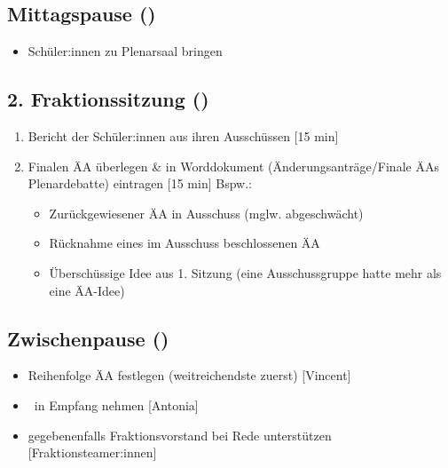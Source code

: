 \documentclass{article}
\newcommand{\KOM}{Antonia}
\newcommand{\EP}{Vincent}
\begin{document}
	\subsection{Mittagspause (\timeMittag)}
	\begin{itemize}
		\item Schüler:innen zu Plenarsaal bringen
	\end{itemize}
	
	\subsection{2. Fraktionssitzung (\timeFrakTwo)}
	\begin{enumerate}
		\item Bericht der Schüler:innen aus ihren Ausschüssen [15 min]
		\item Finalen ÄA überlegen \& in Worddokument \newline (Änderungsanträge/Finale ÄAs Plenardebatte) eintragen [15 min] \newline Bspw.:
		\begin{itemize}
			\item Zurückgewiesener ÄA in Ausschuss (mglw. abgeschwächt)
			\item Rücknahme eines im Ausschuss beschlossenen ÄA
			\item Überschüssige Idee aus 1. Sitzung \newline (eine Ausschussgruppe hatte mehr als eine ÄA-Idee)
		\end{itemize}
	\end{enumerate}
	
	\subsection{Zwischenpause (\timePauseTwo)}
	\begin{itemize}
		\item Reihenfolge ÄA festlegen (weitreichendste zuerst) [\EP]
		\item \STADTVERTRETER\ in Empfang nehmen [\KOM]
		\item gegebenenfalls Fraktionsvorstand bei Rede unterstützen [Fraktionsteamer:innen]
	\end{itemize}
	
\end{document}
